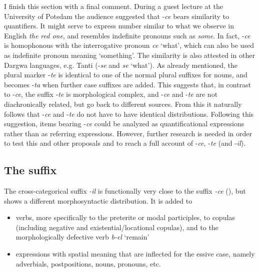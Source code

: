 I finish this section with a final comment. During a guest lecture at the University of Potsdam the audience suggested that -\textit{ce} bears similarity to quantifiers. It might serve to express number similar to what we observe in English \textit{the red one}, and resembles indefinite pronouns such as \textit{some}. In fact, -\textit{ce} is homophonous with the interrogative pronoun \textit{ce} `what', which can also be used as indefinite pronoun meaning `something'. The similarity is also attested in other Dargwa languages, e.g. Tanti (-\textit{se} and \textit{se} `what'). As already mentioned, the plural marker -\textit{te} is identical to one of the normal plural suffixes for nouns, and becomes -\textit{ta} when further case suffixes are added. This suggests that, in contrast to -\textit{ce}, the suffix -\textit{te} is morphological complex, and -\textit{ce} and -\textit{te} are not diachronically related, but go back to different sources. From this it naturally follows that -\textit{ce} and -\textit{te} do not have to have identical distributions. Following this suggestion, items bearing -\textit{ce} could be analyzed as quantificational expressions rather than as referring expressions. However, further research is needed in order to test this and other proposals and to reach a full account of -\textit{ce}, -\textit{te} (and -\textit{il}).



\subsection{The suffix }
\label{ssec:The -il attributive}

The cross-categorical suffix \textit{-il} is functionally very close to the suffix \textit{-ce} (), but shows a different morphosyntactic distribution. It is added to 
\begin{itemize}
	\item verbs, more specifically to the preterite or modal participles, to copulas (including negative and existential\slash locational copulas), and to the morphologically defective verb \textit{b-el} `remain'
	\item expressions with spatial meaning that are inflected for the essive case, namely adverbials, postpositions, nouns, pronouns, etc.
\end{itemize}

